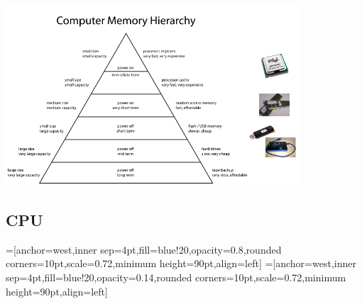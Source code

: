 \documentclass[portuguese,10pt,xcolor=table]{bredelebeamer}
\begin{document}
	\begin{frame}
		\includegraphics[width=11cm]{memoria2.png}
	\end{frame}


	\subsection{CPU}

	\def\BA{A CPU (unidade central de processamento) é \\ um dos responsáveis pelo processamento\\dos dados em um computador.}
	\def\BB{A cada ciclo de clock uma\\instrução é executada na CPU.}
	\def\BC{O conjunto de instruções disponível\\depende do modelo de processador.}

	\def\titulo{A CPU}
	=[anchor=west,inner sep=4pt,fill=blue!20,opacity=0.8,rounded corners=10pt,scale=0.72,minimum height=90pt,align=left]
	=[anchor=west,inner sep=4pt,fill=blue!20,opacity=0.14,rounded corners=10pt,scale=0.72,minimum height=90pt,align=left]
\end{document}
